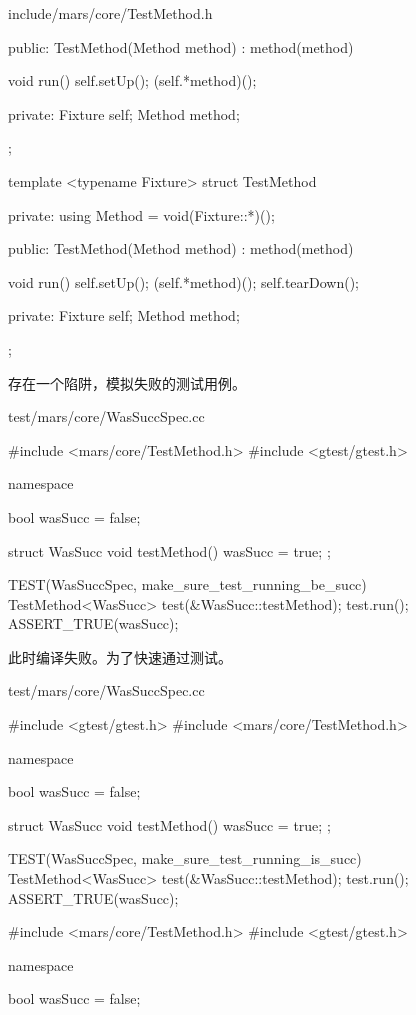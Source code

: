 \begin{content}
\begin{diff}{include/mars/core/TestMethod.h}
\begin{minicpp}
{public:
  TestMethod(Method method)
    : method(method) {}

  void run() {
    self.setUp();
    (self.*method)();
  }

private:
  Fixture self;
  Method method;
};
\end{minicpp}
\tcblower
\begin{minicpp}
template <typename Fixture>
struct TestMethod {
private:
  using Method = void(Fixture::*)();

public:
  TestMethod(Method method)
    : method(method) {}

  void run() {
    self.setUp();
    (self.*method)();
    self.tearDown();
  }

private:
  Fixture self;
  Method method;
};
\end{minicpp}
\end{diff}

存在一个陷阱，模拟失败的测试用例。

\begin{nodiff}{test/mars/core/WasSuccSpec.cc}
\begin{c++}
#include <mars/core/TestMethod.h>
#include <gtest/gtest.h>

namespace {
  bool wasSucc = false;

  struct WasSucc {
    void testMethod() {
      wasSucc = true;
    }
  };
}

TEST(WasSuccSpec, make_sure_test_running_be_succ) {
  TestMethod<WasSucc> test(&WasSucc::testMethod);
  test.run();
  ASSERT_TRUE(wasSucc);
}
\end{c++}
\end{nodiff}

此时编译失败。为了快速通过测试。

\begin{diff}{test/mars/core/WasSuccSpec.cc}
\begin{minicpp}
#include <gtest/gtest.h>
#include <mars/core/TestMethod.h>

namespace {
  bool wasSucc = false;

  struct WasSucc {
    void testMethod() {
      wasSucc = true;
    }
  };
}

TEST(WasSuccSpec, make_sure_test_running_is_succ) {
  TestMethod<WasSucc> test(&WasSucc::testMethod);
  test.run();
  ASSERT_TRUE(wasSucc);
}
\end{minicpp}
\tcblower
\begin{minicpp}
#include <mars/core/TestMethod.h>
#include <gtest/gtest.h>

namespace {
  bool wasSucc = false;

}
\end{minicpp}
\end{diff}
\end{content}
